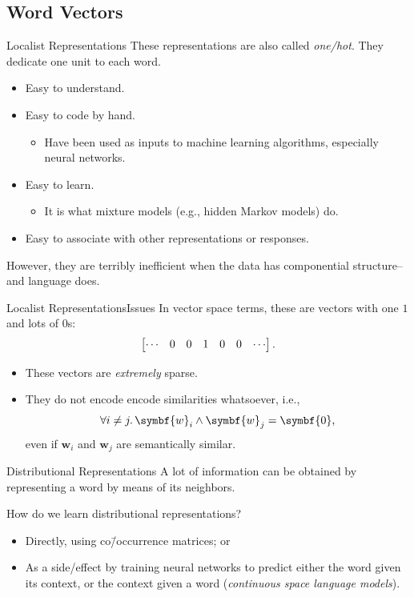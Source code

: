 \documentclass[usepdftitle=false]{beamer}
\theoremstyle{definition}
\renewcommand*{\vec}{\symbf}%
\begin{document}
\subsection{Word Vectors}

\begin{frame}{Localist Representations}
  These representations are also called \emph{one\-/hot}.  They
  dedicate one unit to each word.
  \begin{itemize}
  \item Easy to understand.
  \item Easy to code by hand.
    \begin{itemize}
    \item Have been used as inputs to machine learning algorithms,
      especially neural networks.
    \end{itemize}
  \item Easy to learn.
    \begin{itemize}
    \item It is what mixture models (e.g., hidden Markov models) do.
    \end{itemize}
  \item Easy to associate with other representations or responses.
  \end{itemize}
  \alert{However}, they are terribly inefficient when the data has
  componential structure\--- and language does.
\end{frame}

\begin{frame}{Localist Representations}{Issues}
  In vector space terms, these are vectors with one \(1\) and lots of
  \(0\)s:
  \[
    \begin{bmatrix}
      \cdots & 0 & 0 & 1 & 0 & 0 & \cdots
    \end{bmatrix}\text.
  \]
  \begin{itemize}
  \item These vectors are \emph{extremely} sparse.
  \item They do not encode encode similarities whatsoever, i.e.,
    \[
      \forall i \ne j\ldotp \vec{w}_i \wedge \vec{w}_j = \vec{0}\text,
    \]
    even if \(\vec{w}_i\) and \(\vec{w}_j\) are semantically similar.
  \end{itemize}
\end{frame}

\begin{frame}{Distributional Representations}
  A lot of information can be obtained by representing a word by means
  of its neighbors.
  \begin{displayquote}[J.~R.~Firth]
  \end{displayquote}
  How do we learn distributional representations?
  \begin{itemize}
  \item Directly, using co\=/occurrence matrices; or
  \item As a side\-/effect by training neural networks to predict
    either the word given its context, or the context given a word
    (\emph{continuous space language models}).
  \end{itemize}
\end{frame}
\end{document}

